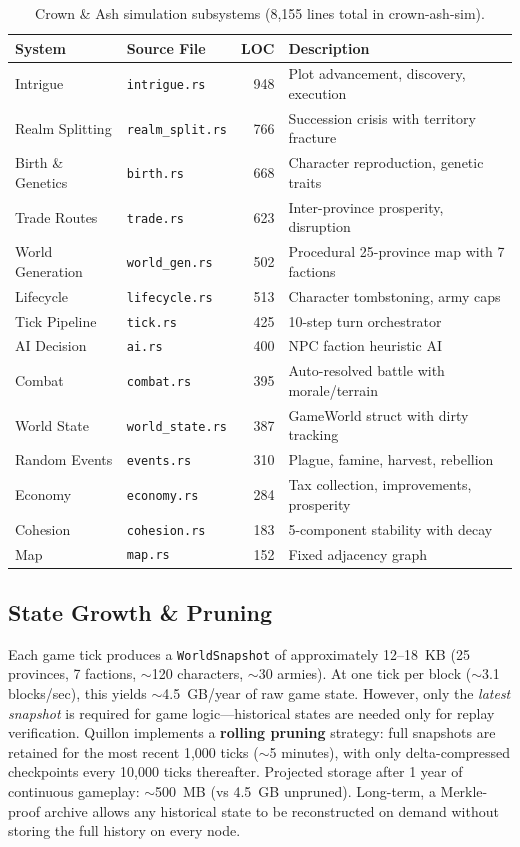\documentclass[11pt,a4paper]{article}
\begin{document}
\begin{table}[H]
\centering
\small
\begin{tabular}{l l r l}
\toprule
\textbf{System} & \textbf{Source File} & \textbf{LOC} & \textbf{Description} \\
\midrule
Intrigue & \texttt{intrigue.rs} & 948 & Plot advancement, discovery, execution \\
Realm Splitting & \texttt{realm\_split.rs} & 766 & Succession crisis with territory fracture \\
Birth \& Genetics & \texttt{birth.rs} & 668 & Character reproduction, genetic traits \\
Trade Routes & \texttt{trade.rs} & 623 & Inter-province prosperity, disruption \\
World Generation & \texttt{world\_gen.rs} & 502 & Procedural 25-province map with 7 factions \\
Lifecycle & \texttt{lifecycle.rs} & 513 & Character tombstoning, army caps \\
Tick Pipeline & \texttt{tick.rs} & 425 & 10-step turn orchestrator \\
AI Decision & \texttt{ai.rs} & 400 & NPC faction heuristic AI \\
Combat & \texttt{combat.rs} & 395 & Auto-resolved battle with morale/terrain \\
World State & \texttt{world\_state.rs} & 387 & GameWorld struct with dirty tracking \\
Random Events & \texttt{events.rs} & 310 & Plague, famine, harvest, rebellion \\
Economy & \texttt{economy.rs} & 284 & Tax collection, improvements, prosperity \\
Cohesion & \texttt{cohesion.rs} & 183 & 5-component stability with decay \\
Map & \texttt{map.rs} & 152 & Fixed adjacency graph \\
\bottomrule
\end{tabular}
\caption{Crown \& Ash simulation subsystems (8,155 lines total in crown-ash-sim).}
\end{table}

\subsection{State Growth \& Pruning}

Each game tick produces a \texttt{WorldSnapshot} of approximately 12--18~KB (25 provinces, 7 factions, $\sim$120 characters, $\sim$30 armies). At one tick per block ($\sim$3.1 blocks/sec), this yields $\sim$4.5~GB/year of raw game state. However, only the \emph{latest snapshot} is required for game logic---historical states are needed only for replay verification. Quillon implements a \textbf{rolling pruning} strategy: full snapshots are retained for the most recent 1,000 ticks ($\sim$5 minutes), with only delta-compressed checkpoints every 10,000 ticks thereafter. Projected storage after 1 year of continuous gameplay: $\sim$500~MB (vs 4.5~GB unpruned). Long-term, a Merkle-proof archive allows any historical state to be reconstructed on demand without storing the full history on every node.
\end{document}
